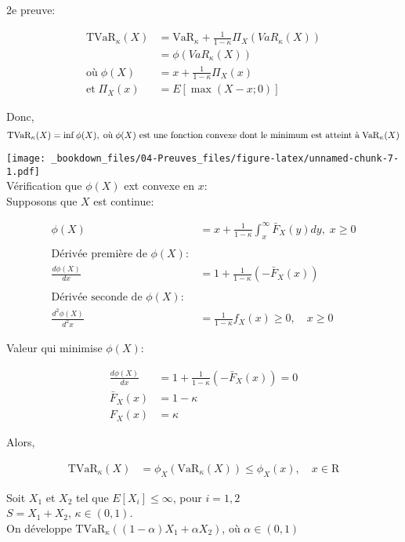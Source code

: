 2e preuve:

\begin{align*}
\text{TVaR}_\kappa(X)& =\text{VaR}_\kappa+\frac{1}{1-\kappa}\Pi_X(VaR_\kappa(X))\\
& =\phi(VaR_\kappa(X))\\
\text{où}\;\phi(X)& =x + \frac{1}{1-\kappa}\Pi_X(x)\\
\text{et}\; \Pi_X(x)& = E\left[\max(X-x;0)\right]
\end{align*}

Donc, \[
\text{TVaR}_\kappa(X)= \inf \phi(X),\; \text{où}\;\phi(X) \text{ est une fonction convexe}   
\\
\text{ dont le minimum est atteint à}\; \text{VaR}_\kappa(X)
\] 

\texttt{[image: \_bookdown\_files/04-Preuves\_files/figure-latex/unnamed-chunk-7-1.pdf]}\\

Vérification que \(\phi(X)\) ext convexe en \(x\):\\
Supposons que \(X\) est continue:

\begin{align*}
\phi(X)& =x + \frac{1}{1-\kappa} \int^{\infty}_x \bar{F}_X(y)dy,\;x\geq 0\\
\\
\text{Dérivée première de }\phi(X):\\
\frac{d\phi(X)}{dx}& =1+\frac{1}{1-\kappa}(-\bar{F}_X(x))\\
\\
\text{Dérivée seconde de }\phi(X):\\
\frac{d^2\phi(X)}{d^2x}& =\frac{1}{1-\kappa}f_X(x)\geq 0,\quad x\geq 0
\end{align*}

Valeur qui minimise \(\phi(X)\):

\begin{align*}
\frac{d\phi(X)}{dx}& = 1+\frac{1}{1-\kappa}(-\bar{F}_X(x))=0\\
\bar{F}_X(x)& =1-\kappa\\
F_X(x)& =\kappa
\end{align*}

Alors,

\begin{align*}
\text{TVaR}_\kappa(X)& =\phi_X(\text{VaR}_\kappa(X)) \leq \phi_X(x),\quad x\in \mathrm{R}
\end{align*}

Soit \(X_1\) et \(X_2\) tel que \(E[X_i]\le\infty\), pour \(i=1,2\)\\
\(S=X_1+X_2\), \(\kappa\in(0,1)\).\\
On développe \(\text{TVaR}_\kappa((1-\alpha)X_1+\alpha X_2)\), où
\(\alpha\in(0,1)\)

